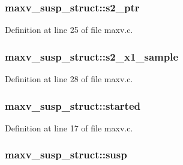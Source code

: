 \subsubsection[{\texorpdfstring{s2\+\_\+ptr}{s2_ptr}}]{ maxv\+\_\+susp\+\_\+struct\+::s2\+\_\+ptr}\hypertarget{structmaxv__susp__struct_acdf3a1ba6903e1d13ebb5a569f7bce4d}{}\label{structmaxv__susp__struct_acdf3a1ba6903e1d13ebb5a569f7bce4d}


Definition at line 25 of file maxv.\+c.

\subsubsection[{\texorpdfstring{s2\+\_\+x1\+\_\+sample}{s2_x1_sample}}]{ maxv\+\_\+susp\+\_\+struct\+::s2\+\_\+x1\+\_\+sample}\hypertarget{structmaxv__susp__struct_a598d04f72df0ff955fa8d5c43e6f7008}{}\label{structmaxv__susp__struct_a598d04f72df0ff955fa8d5c43e6f7008}


Definition at line 28 of file maxv.\+c.

\subsubsection[{\texorpdfstring{started}{started}}]{ maxv\+\_\+susp\+\_\+struct\+::started}\hypertarget{structmaxv__susp__struct_ad18d30c27c8ed198f3a1a1d859fa6c09}{}\label{structmaxv__susp__struct_ad18d30c27c8ed198f3a1a1d859fa6c09}


Definition at line 17 of file maxv.\+c.

\subsubsection[{\texorpdfstring{susp}{susp}}]{ maxv\+\_\+susp\+\_\+struct\+::susp}\hypertarget{structmaxv__susp__struct_af857fb3358f9139fc8560d27fa523978}{}\label{structmaxv__susp__struct_af857fb3358f9139fc8560d27fa523978}


